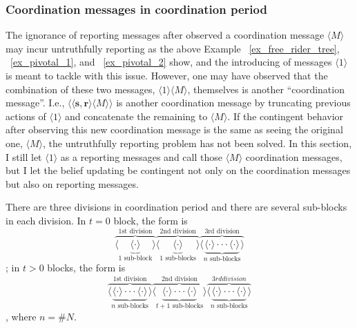 \documentclass[12pt,letter]{article}
\theoremstyle{definition}
\theoremstyle{remark}
\theoremstyle{claim}
\begin{document}
\subsubsection*{Coordination messages in coordination period}

The ignorance of reporting messages after observed a coordination message $\langle M \rangle$ may incur untruthfully reporting as the above Example ~\ref{ex_free_rider_tree}, ~\ref{ex_pivotal_1}, and ~\ref{ex_pivotal_2} show, and the introducing of messages $\langle 1 \rangle$ is meant to tackle with this issue. However, one may have observed that the combination of these two messages, $\langle 1 \rangle\langle M \rangle$, themselves is another ``coordination message''. I.e., $\langle\langle \textbf{s}, \textbf{r} \rangle\langle M \rangle\rangle$ is another coordination message by truncating previous actions of $\langle 1 \rangle$ and concatenate the remaining to $\langle M \rangle$. If the contingent behavior after observing this new coordination message is the same as seeing the original one, $\langle M \rangle$, the untruthfully reporting problem has not been solved. In this section, I still let $\langle 1 \rangle$ as a reporting messages and call those $\langle M \rangle$ coordination messages, but I let the belief updating be contingent not only on the coordination messages but also on reporting messages.


There are three divisions in coordination period and there are several sub-blocks in each division. In $t=0$ block, the form is
\[\overbrace{\langle\underbrace{\langle \cdot \rangle }_{\text{$1$ sub-block}}\rangle}^{\text{1st division}} \overbrace{\langle\underbrace{\langle \cdot \rangle }_{\text{$1$ sub-blocks}} \rangle}^{\text{2nd division}} \overbrace{\langle\underbrace{\langle \cdot \rangle \cdot \cdot \cdot \langle \cdot \rangle}_{\text{$n$ sub-blocks}}\rangle}^{\text{3rd division}}\] 
; in $t>0$ blocks, the form is
\[\overbrace{\langle\underbrace{\langle \cdot \rangle \cdot \cdot \cdot \langle \cdot \rangle}_{\text{$n$ sub-blocks}}\rangle}^{\text{1st division}} \overbrace{\langle\underbrace{\langle \cdot \rangle \cdot \cdot \cdot \langle \cdot \rangle}_{\text{$t+1$ sub-blocks}} \rangle}^{\text{2nd division}} \overbrace{\langle\underbrace{\langle \cdot \rangle \cdot \cdot \cdot \langle \cdot \rangle}_{\text{$n$ sub-blocks}}\rangle}^{3rd division}\] 
, where $n=\# N$. 
\end{document}
